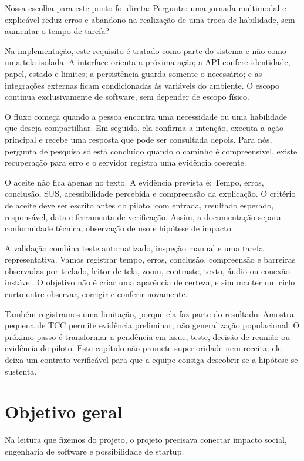 \documentclass[12pt,oneside,a4paper,article]{abntex2}
\begin{document}
Nossa escolha para este ponto foi direta: Pergunta: uma jornada multimodal e explicável reduz erros e abandono na realização de uma troca de habilidade, sem aumentar o tempo de tarefa?

Na implementação, este requisito é tratado como parte do sistema e não como uma tela isolada. A interface orienta a próxima ação; a API confere identidade, papel, estado e limites; a persistência guarda somente o necessário; e as integrações externas ficam condicionadas às variáveis do ambiente. O escopo continua exclusivamente de software, sem depender de escopo físico.

O fluxo começa quando a pessoa encontra uma necessidade ou uma habilidade que deseja compartilhar. Em seguida, ela confirma a intenção, executa a ação principal e recebe uma resposta que pode ser consultada depois. Para nós, pergunta de pesquisa só está concluído quando o caminho é compreensível, existe recuperação para erro e o servidor registra uma evidência coerente.

O aceite não fica apenas no texto. A evidência prevista é: Tempo, erros, conclusão, SUS, acessibilidade percebida e compreensão da explicação. O critério de aceite deve ser escrito antes do piloto, com entrada, resultado esperado, responsável, data e ferramenta de verificação. Assim, a documentação separa conformidade técnica, observação de uso e hipótese de impacto.

A validação combina teste automatizado, inspeção manual e uma tarefa representativa. Vamos registrar tempo, erros, conclusão, compreensão e barreiras observadas por teclado, leitor de tela, zoom, contraste, texto, áudio ou conexão instável. O objetivo não é criar uma aparência de certeza, e sim manter um ciclo curto entre observar, corrigir e conferir novamente.

Também registramos uma limitação, porque ela faz parte do resultado: Amostra pequena de TCC permite evidência preliminar, não generalização populacional. O próximo passo é transformar a pendência em issue, teste, decisão de reunião ou evidência de piloto. Este capítulo não promete superioridade nem receita: ele deixa um contrato verificável para que a equipe consiga descobrir se a hipótese se sustenta.

\section{Objetivo geral}
Na leitura que fizemos do projeto, o projeto precisava conectar impacto social, engenharia de software e possibilidade de startup.
\end{document}
